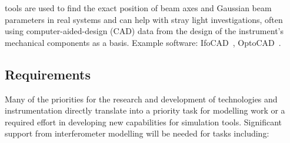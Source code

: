  tools are used to find the exact position of beam axes and Gaussian beam parameters in real systems and can help with stray light investigations, often using computer-aided-design (CAD) data from the design of the instrument's mechanical components as a basis. Example software: IfoCAD~\cite{IfoCAD, kochkina}, OptoCAD~\cite{OptoCAD}.

\subsection{Requirements}
\label{sec:Sim:Req}
Many of the priorities for the research and development of technologies and instrumentation directly translate into a priority task for modelling work or a required effort in developing new capabilities for simulation tools. 
Significant support from interferometer modelling will be needed for tasks including:
